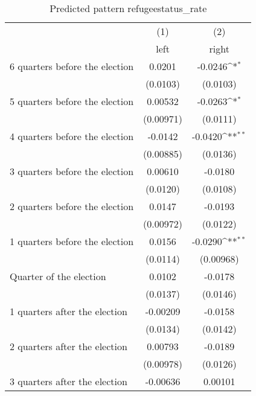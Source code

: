 \begin{table}[htbp]\centering
\def\sym#1{\ifmmode^{#1}\else\(^{#1}\)\fi}
\caption{Predicted pattern refugeestatus\_rate}
\begin{tabular}{l*{2}{c}}
\hline\hline
                    &\multicolumn{1}{c}{(1)}&\multicolumn{1}{c}{(2)}\\
                    &\multicolumn{1}{c}{left}&\multicolumn{1}{c}{right}\\
\hline
 6 quarters before the election&      0.0201         &     -0.0246\sym{*}  \\
                    &    (0.0103)         &    (0.0103)         \\
[1em]
 5 quarters before the election&     0.00532         &     -0.0263\sym{*}  \\
                    &   (0.00971)         &    (0.0111)         \\
[1em]
 4 quarters before the election&     -0.0142         &     -0.0420\sym{**} \\
                    &   (0.00885)         &    (0.0136)         \\
[1em]
 3 quarters before the election&     0.00610         &     -0.0180         \\
                    &    (0.0120)         &    (0.0108)         \\
[1em]
 2 quarters before the election&      0.0147         &     -0.0193         \\
                    &   (0.00972)         &    (0.0122)         \\
[1em]
 1 quarters before the election&      0.0156         &     -0.0290\sym{**} \\
                    &    (0.0114)         &   (0.00968)         \\
[1em]
Quarter of the election&      0.0102         &     -0.0178         \\
                    &    (0.0137)         &    (0.0146)         \\
[1em]
 1 quarters after the election&    -0.00209         &     -0.0158         \\
                    &    (0.0134)         &    (0.0142)         \\
[1em]
 2 quarters after the election&     0.00793         &     -0.0189         \\
                    &   (0.00978)         &    (0.0126)         \\
[1em]
 3 quarters after the election&    -0.00636         &     0.00101         \\

\end{tabular}
\end{table}
